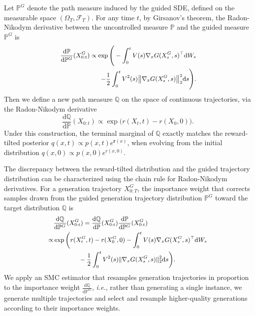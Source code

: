 \documentclass{article}
\theoremstyle{plain}
\theoremstyle{definition}
\theoremstyle{remark}
\newcommand{\dif}{{\mathrm{d}}}
\renewcommand{\P}{{\mathbb{P}}}
\newcommand{\Q}{{\mathbb{Q}}}
\begin{document}
Let $\P^{G}$ denote the path measure induced by the guided SDE, defined on the measurable space $(\Omega_T, \mathcal{F}_T)$. For any time $t$, by Girsanov's theorem, the Radon-Nikodym derivative between the uncontrolled measure $\P$ and the guided measure $\P^{G}$ is
\begin{equation}
\small
\begin{aligned}
    \frac{\dif \P}{\dif \P^{G}}(X^{G}_{0:t})
    \propto 
    \exp\Bigg(
    - \int_0^t V(s)\nabla_x G(X_s^{G},s)^\top \dif W_s
    \\- \frac{1}{2}\int_0^t V^2(s) \bigl\|\nabla_x G(X_s^{G},s)\bigr\|_2^2 \dif s
    \Bigg).
\end{aligned}
\label{eq:girsanov}
\end{equation}
Then we define a new path measure \(\Q\) on the space of continuous trajectories, via the Radon-Nikodym derivative 
$$
    \frac{\dif \Q}{\dif \P}(X_{0:t}) \propto \exp\bigl(r(X_t,t) - r(X_0,0)\bigr).
$$ 
Under this construction, the terminal marginal of \(\Q\) exactly matches the reward-tilted posterior \(q(x, t) \propto p(x, t)  e^{\mathbf r(x)}\), when evolving from the initial distribution $q(x,0) \propto p(x, 0) e^{r(x, 0)}$.


The discrepancy between the reward-tilted distribution and the guided trajectory distribution can be characterized using the chain rule for Radon-Nikodym derivatives. For a generation trajectory $X^{G}_{0:T}$, the importance weight that corrects samples drawn from the guided generation trajectory distribution $\P^{G}$ toward the target distribution $\Q$ is
\begin{equation}
\small
\label{eq:URGEweight}
    \begin{aligned}
        &\frac{\dif \Q}{\dif \P^{G}}(X^G_{0:t})
        =
        \frac{\dif \Q}{\dif \P}(X^G_{0:t})
        \frac{\dif \P}{\dif \P^{G}}(X^G_{0:t})\\
        \propto&
        \exp\bigg(
        r(X_t^{G},t) - r(X_0^{G},0)- \int_0^t V(s)\nabla_x G(X_s^{G},s)^\top \dif W_s
        \\&\qquad \qquad- \frac12 \int_0^t V^2(s) \|\nabla_x G(X_s^{G},s)\|_2^2 \dif s
        \bigg).
    \end{aligned}
\end{equation}
We apply an SMC estimator that resamples generation trajectories in proportion to the importance weight $\frac{\dif \Q}{\dif \P^{G}}$, \emph{i.e.}, rather than generating a single instance, we generate multiple trajectories and select and resample higher-quality generations according to their importance weights. 
\end{document}
